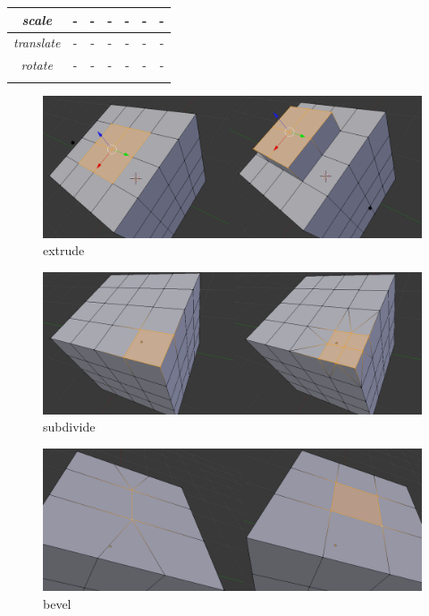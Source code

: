 \documentclass{article}
\begin{document}
\begin{table}[!h]
\begin{tabular}{|c|c|c|c|c|c|c|}
\hline
\hline

\emph{scale} 
& - & - & -
& - & - & -  \\
\hline

\emph{translate} 
& - & - & -
& - & - & -  \\
\hline

\emph{rotate} 
& - & - & -
& - & - & -  \\
\hline

\rowcolor{blue}
\end{tabular}
\end{table}

\newpage

\begin{figure}[!h]
\includegraphics[scale=0.25]{extrude.png}
\caption{extrude}
\end{figure}

\begin{figure}[!h]
\includegraphics[scale=0.25]{subdivide.png}
\caption{subdivide}
\end{figure}

\begin{figure}[!h]
\includegraphics[scale=0.25]{bevel1.png}
\caption{bevel}
\end{figure}
\end{document}
